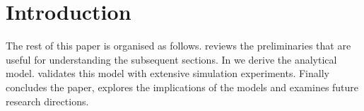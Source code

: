 
\section{Introduction}
\label{sec:introduction}
The rest of this paper is organised as follows.  reviews the preliminaries that are useful for understanding the subsequent sections. In  we derive the analytical model.  validates this model with extensive simulation experiments. Finally  concludes the paper, explores the implications of the models and examines future research directions.